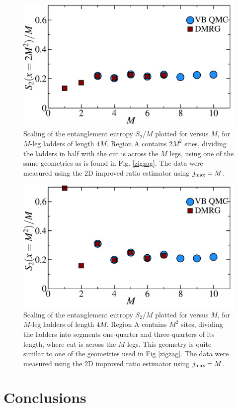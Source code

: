\begin{figure} {
	\hspace{1cm}
	\includegraphics[width=5in]{./figures/made/awesomeplot/marea2.pdf} 
	\caption[Entanglement entropy $S_2/M$ vs. $M$ for $M$-leg ladders of length $4M$ cut in half]{ 
Scaling of the entanglement entropy $S_2/M$ plotted for versus $M$, for $M$-leg ladders of length $4M$.  
Region A contains $2M^2$ sites, dividing the ladders in half with the cut is across the $M$ legs, using one of the same geometries as is found in Fig. \ref{zigzag}.
The data were measured using the 2D improved ratio estimator using $j_{\rm max} = M$.
	\label{2Dbetter1}
	}
} \end{figure}
\begin{figure} {
\hspace{1cm}
	\includegraphics[width=5in]{./figures/made/awesomeplot/marea.pdf} 
	\caption[Entanglement entropy $S_2/M$ vs. $M$ for $M$-leg ladders of length $4M$ with a different cut]{ 
	Scaling of the entanglement entropy $S_2/M$ plotted for versus $M$, for $M$-leg ladders of length $4M$.  
Region A contains $M^2$ sites, dividing the ladders into segments one-quarter and three-quarters of its length, where cut is across the $M$ legs.  This geometry is quite similar to one of the geometries used in Fig \ref{zigzag}.
The data were measured using the 2D improved ratio estimator using $j_{\rm max} = M$.
		\label{2Dbetter2}
	}
} \end{figure}

\section{Conclusions}
